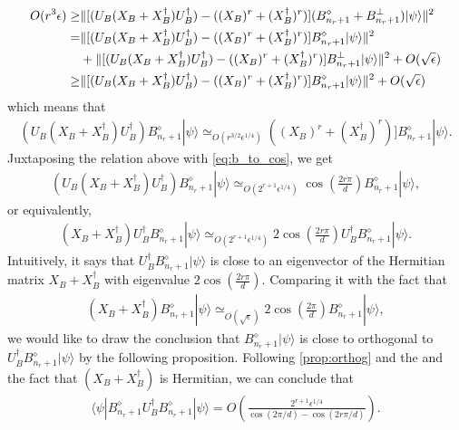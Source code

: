\documentclass[11pt,letterpaper]{article}
\newcommand{\ket}[1]{|#1\rangle}
\newcommand{\bra}[1]{\langle#1|}
\newcommand{\ct}{^{\dagger}}
\DeclarePairedDelimiter{\norm}{\lVert}{\rVert}
\newcommand{\1}{\mathbb{1}}
\newcommand{\appd}[1]{\simeq_{#1}}
\theoremstyle{definition}
\begin{document}
\begin{align}
	O(r^3\epsilon) \geq &\norm{[(U_B(X_B+X_B\ct)U_B\ct) - ((X_B)^r + (X_B\ct)^r)](B_{n_r+1}^\diamond + B_{n_r+1}^\perp)\ket{\psi}}^2\\
	= &\norm{[(U_B(X_B+X_B\ct)U_B\ct) - ((X_B)^r + (X_B\ct)^r)]B_{n_r+1}^\diamond\ket{\psi}}^2\\
	&+ \norm{[(U_B(X_B+X_B\ct)U_B\ct) - ((X_B)^r + (X_B\ct)^r)]B_{n_r+1}^\perp\ket{\psi}}^2 +O(\sqrt{\epsilon})\\
	\geq &\norm{[(U_B(X_B+X_B\ct)U_B\ct) - ((X_B)^r + (X_B\ct)^r)]B_{n_r+1}^\diamond\ket{\psi}}^2 + O(\sqrt{\epsilon})
\end{align}
which means that 
\begin{align}
(U_B(X_B+X_B\ct)U_B\ct)B_{n_r+1}^\diamond \ket{\psi} \appd{O(r^{3/2} \epsilon^{1/4})}((X_B)^r + (X_B\ct)^r)]B_{n_r+1}^\diamond\ket{\psi}.
\end{align}
Juxtaposing the relation above with \cref{eq:b_to_cos}, we get
\begin{align}
	(U_B(X_B+X_B\ct)U_B\ct) B_{n_r+1}^\diamond \ket{\psi} 
	\appd{O(2^{r+1}\epsilon^{1/4})} \cos(\frac{2r\pi}{d}) B_{n_r+1}^\diamond\ket{\psi},
\end{align}
or equivalently,
\begin{align}
	(X_B + X_B\ct) U_B\ct B_{n_r+1}^\diamond \ket{\psi} \appd{O(2^{r+1}\epsilon^{1/4})}  
	2\cos(\frac{2r\pi}{d}) U_B\ct B_{n_r+1}^\diamond \ket{\psi}.
\end{align}
Intuitively, it says that $U_B\ct B_{n_r+1}^\diamond \ket{\psi}$ is close to an eigenvector of 
the Hermitian matrix $X_B +X_B\ct$ with eigenvalue $2\cos(\frac{2r\pi}{d})$.
Comparing it with the fact that
\begin{align}
(X_B + X_B\ct) B_{n_r+1}^\diamond \ket{\psi} \appd{O(\sqrt{\epsilon})}  
	2\cos(\frac{2\pi}{d}) B_{n_r+1}^\diamond \ket{\psi},
\end{align}
we would like to draw the conclusion that $B_{n_r+1}^\diamond \ket{\psi}$ is 
close to orthogonal to $U_B\ct B_{n_r+1}^\diamond \ket{\psi}$
by the following proposition.
Following \cref{prop:orthog} and the 
and the fact that $(X_B + X_B\ct)$ is Hermitian, we can conclude that
\begin{align}
\bra{\psi}B_{n_r+1}^\diamond U_B\ct B_{n_r+1}^\diamond \ket{\psi} = O(\frac{2^{r+1}\epsilon^{1/4}}{\cos(2\pi/d) - \cos(2r\pi/d)}).
\end{align}
\end{document}
